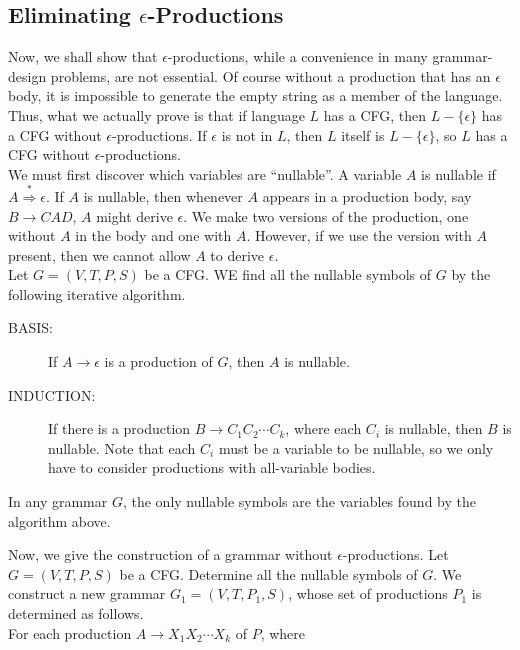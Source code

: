 \documentclass[]{article}
\begin{document}
  \subsection*{Eliminating $\epsilon$-Productions}
    Now, we shall show that $\epsilon$-productions, while a convenience in many
    grammar-design problems, are not essential. Of course without a production
    that has an $\epsilon$ body, it is impossible to generate the empty string
    as a member of the language. Thus, what we actually prove is that if
    language $L$ has a CFG, then $L - \{\epsilon\}$ has a CFG without
    $\epsilon$-productions. If $\epsilon$ is not in $L$, then $L$ itself is
    $L - \{\epsilon\}$, so $L$ has a CFG without $\epsilon$-productions. \\
    \indent We must first discover which variables are ``nullable''. A variable
    $A$ is nullable if $A \overset{*}{\Rightarrow} \epsilon$. If $A$ is
    nullable, then whenever $A$ appears in a production body, say
    $B \rightarrow CAD$, $A$ might derive $\epsilon$. We make two versions of
    the production, one without $A$ in the body and one with $A$. However, if we
    use the version with $A$ present, then we cannot allow $A$ to derive
    $\epsilon$. \\
    \indent Let $G =(V,T,P,S)$ be a CFG. WE find all the nullable symbols of $G$
    by the following iterative algorithm.
      \begin{description}
        \item[BASIS:] If $A \rightarrow \epsilon$ is a production of $G$, then
        $A$ is nullable.
        \item[INDUCTION:] If there is a production $B \rightarrow C_1C_2\cdots{}
        C_k$, where each $C_i$ is nullable, then $B$ is nullable. Note that each
        $C_i$ must be a variable to be nullable, so we only have to consider
        productions with all-variable bodies.
      \end{description}
      \begin{thm}
        In any grammar $G$, the only nullable symbols are the variables found by
        the algorithm above.
      \end{thm}
    \indent Now, we give the construction of a grammar without
    $\epsilon$-productions. Let  $G = (V,T,P,S)$ be a CFG. Determine all the
    nullable symbols of $G$. We construct a new grammar $G_1 = (V,T,P_1,S)$,
    whose set of productions $P_1$ is determined as follows. \\
    \indent For each production $A \rightarrow X_1X_2\cdots{}X_k$ of $P$, where
\end{document}
